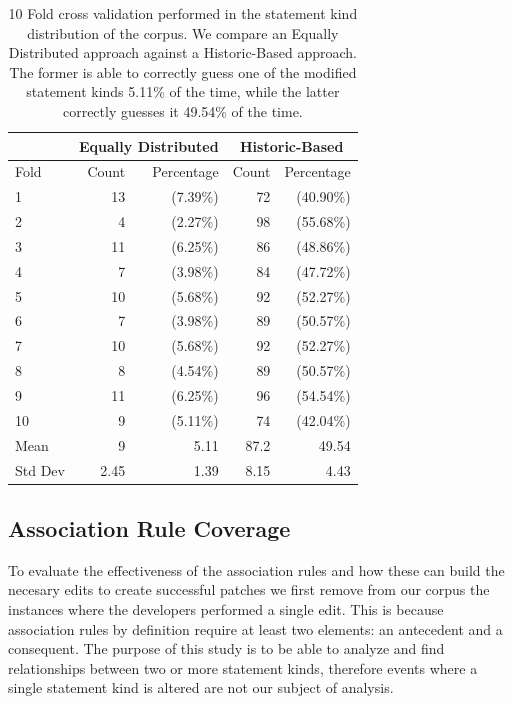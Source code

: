 \documentclass[sigconf]{acmart}
\begin{document}
\begin{table}[]
\centering
\caption{10 Fold cross validation performed in the statement kind distribution of the corpus. 
We compare an Equally Distributed approach against a Historic-Based approach. The former is 
able to correctly guess one of the modified statement kinds 5.11\% of the time, while the 
latter correctly guesses it 49.54\% of the time.}
\label{10FoldEDvsHB}
\begin{tabular}{l|rr|rr|}
\toprule
   &   \multicolumn{2}{c|}{ Equally Distributed}   &   \multicolumn{2}{|c|}{ Historic-Based} \\
\midrule
Fold  &   Count & Percentage  &  Count & Percentage  \\
\midrule
1&13&(7.39\%) & 72&(40.90\%) \\
2&4&(2.27\%) & 98&(55.68\%) \\
3&11&(6.25\%) & 86&(48.86\%) \\
4&7&(3.98\%) & 84&(47.72\%) \\
5&10&(5.68\%) & 92&(52.27\%) \\
6&7&(3.98\%) & 89&(50.57\%) \\
7&10&(5.68\%) & 92&(52.27\%) \\
8&8&(4.54\%) & 89&(50.57\%) \\
9&11&(6.25\%) & 96&(54.54\%) \\
10&9&(5.11\%) & 74&(42.04\%) \\
\bottomrule
Mean &9 & 5.11 & 87.2 & 49.54 \\
\bottomrule
Std Dev & 2.45 & 1.39 & 8.15 & 4.43 \\
\bottomrule

\end{tabular}
\end{table}



\subsection{Association Rule Coverage}
To evaluate the effectiveness
of the association rules and how these can build the
necesary edits to create successful patches we first
remove from our corpus the instances where the developers
performed a single edit. This is because association rules
by definition require at least two elements: an antecedent
and a consequent. The purpose of this study is to be able to
analyze and find relationships between two or more statement
kinds, therefore events where a single statement kind is altered
are not our subject of analysis.
\end{document}
